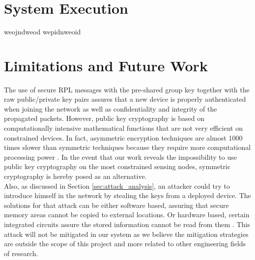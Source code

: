 \section{System Execution}
\label{sec:system_execution}

weojndweod
wepidnweoid

\section{Limitations and Future Work}
\paragraph{}
The use of secure RPL messages with the pre-shared group key together with the raw public/private key pairs assures that a new device is properly authenticated when joining the network as well as confidentiality and integrity of the propagated packets. However, public key cryptography is based on computationally intensive mathematical functions that are not very efficient on constrained devices. In fact, asymmetric encryption techniques are almost 1000 times slower than symmetric techniques because they require more computational processing power \cite{Kumar2011}. In the event that our work reveals the impossibility to use public key cryptography on the most constrained sensing nodes, symmetric cryptography is hereby posed as an alternative.\\
Also, as discussed in Section \ref{sec:attack_analysis}, an attacker could try to introduce himself in the network by stealing the keys from a deployed device. The solutions for that attack can be either software based, assuring that secure memory areas cannot be copied to external locations. Or hardware based, certain integrated circuits assure the stored information cannot be read from them \cite{Lesjak2014}. This attack will not be mitigated in our system as we believe the mitigation strategies are outside the scope of this project and more related to other engineering fields of research.\\